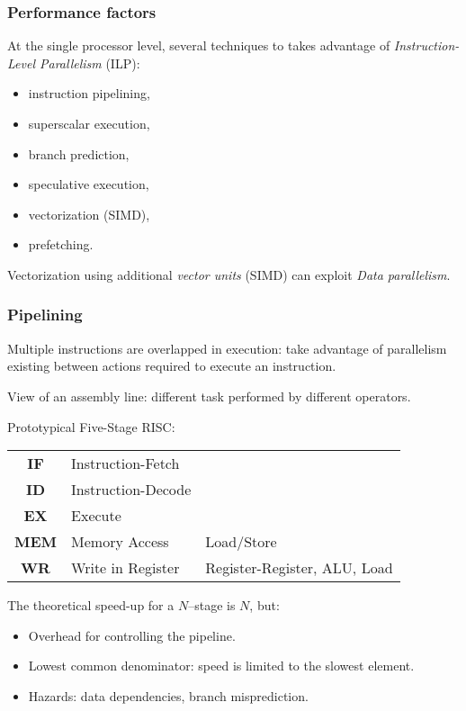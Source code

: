 \begin{frame}[fragile]
  \frametitle{Performance factors}

At the single processor level, several techniques to takes advantage of \textit{Instruction-Level Parallelism} (ILP):
\begin{itemize}
\item instruction pipelining,
\item superscalar execution,
\item branch prediction,
\item speculative execution,
\item vectorization (SIMD),
\item prefetching.
\end{itemize}

\medskip
Vectorization using additional \textit{vector units} (SIMD) can exploit \textit{Data parallelism}.

\end{frame}


\begin{frame}[fragile]
  \frametitle{Pipelining}

Multiple instructions are overlapped in execution: take advantage of parallelism existing between actions required to execute an instruction.

\medskip
View of an assembly line: different task performed by different operators.

\medskip
Prototypical Five-Stage RISC:
\begin{tabular}{c|l|l|}
\textbf{IF}  & Instruction-Fetch  & \\
\textbf{ID}  & Instruction-Decode & \\
\textbf{EX}  & Execute            & \\
\textbf{MEM} & Memory Access      & Load/Store \\
\textbf{WR}  & Write in Register  & Register-Register, ALU, Load\\
\end{tabular}

The theoretical speed-up for a $N$--stage is $N$, but:
\begin{itemize}
\item Overhead for controlling the pipeline.
\item Lowest common denominator: speed is limited to the slowest element.
\item Hazards: data dependencies, branch misprediction.
\end{itemize}

\end{frame}

